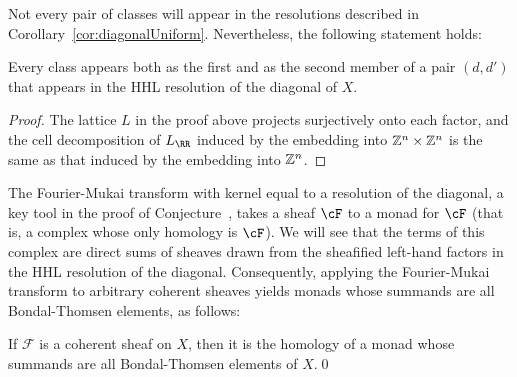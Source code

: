 \documentclass{amsart}
\begin{document}
Not every pair of \BT classes will appear in the resolutions described in Corollary~\ref{cor:diagonalUniform}.
Nevertheless, the following statement holds:
\begin{cor}\label{cor:diagonal-BTcollection}
Every \BT class appears both as the first and as the second member of a pair $(d,d')$ that appears in the HHL resolution of the diagonal of $X$. \end{cor}
\begin{proof}
The lattice $L$ in the proof above projects surjectively onto each factor, and the cell decomposition of $L_{\RR}$
induced by the embedding into $\mathbb Z^{n}\times \mathbb Z^{n}$ is the same as that induced by the embedding into
$\mathbb Z^{n}$.
\end{proof}

The Fourier-Mukai transform with kernel equal to a resolution of the diagonal,  a key tool in the proof of Conjecture~\cite{BES}, takes a sheaf $\cF$ to a monad for $\cF$ (that is, a complex whose only homology is $\cF$).  We will see  that the terms of this complex are direct sums of sheaves
 drawn from the sheafified left-hand factors in the HHL resolution of the diagonal. Consequently, applying the Fourier-Mukai transform to arbitrary coherent sheaves yields monads whose summands are all Bondal-Thomsen elements, as follows:

\begin{cor}
  If $\mathcal{F}$ is a coherent sheaf on $X$, then it is the homology of a monad whose summands are all Bondal-Thomsen elements of $X$.\qed
\end{cor}
\end{document}
